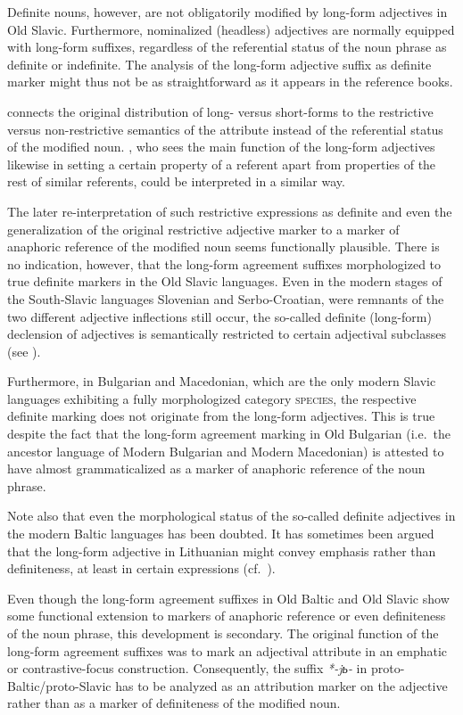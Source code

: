 Definite nouns, however, are not obligatorily modified by long-form adjectives in Old Slavic. Furthermore, nominalized (headless) adjectives are normally equipped with long-form suffixes, regardless of the referential status of the noun phrase as definite or indefinite. The analysis of the long-form adjective suffix as definite marker might thus not be as straightforward as it appears in the reference books. 

\citet[214–215]{mendoza2004} connects the original distribution of long- versus short-forms to the restrictive versus non-restrictive semantics of the attribute instead of the referential status of the modified noun. \citet{tolstoj1957}, who sees the main function of the long-form adjectives likewise in setting a certain property of a referent apart from properties of the rest of similar referents, could be interpreted in a similar way.

The later re-interpretation of such restrictive expressions as definite and even the generalization of the original restrictive adjective marker to a marker of anaphoric reference of the modified noun seems functionally plausible. There is no indication, however, that the long-form agreement suffixes morphologized to true definite markers in the Old Slavic languages. Even in the modern stages of the South-Slavic languages Slovenian and Serbo-Croatian, were remnants of the two different adjective inflections still occur, the so-called definite (long-form) declension of adjectives is semantically restricted to certain adjectival subclasses (see ). 

Furthermore, in Bulgarian and Macedonian, which are the only modern Slavic languages exhibiting a fully morphologized category \textsc{species}, the respective definite marking does not originate from the long-form adjectives. This is true despite the fact that the long-form agreement marking in Old Bulgarian (i.e.~the ancestor language of Modern Bulgarian and Modern Macedonian) is attested to have almost grammaticalized as a marker of anaphoric reference of the noun phrase.

Note also that even the morphological status of the so-called definite adjectives in the modern Baltic languages has been doubted. It has sometimes been argued that the long-form adjective in Lithuanian might convey emphasis rather than definiteness, at least in certain expressions (cf.~\citealt[181–182]{kramsky1972}).

Even though the long-form agreement suffixes in Old Baltic and Old Slavic show some functional extension to markers of anaphoric reference or even definiteness of the noun phrase, this development is secondary. The original function of the long-form agreement suffixes was to mark an adjectival attribute in an emphatic or contrastive-focus construction. Consequently, the suffix \textit{*-jь-} in proto-Baltic/proto-Slavic has to be analyzed as an attribution marker on the adjective rather than as a marker of definiteness of the modified noun.

